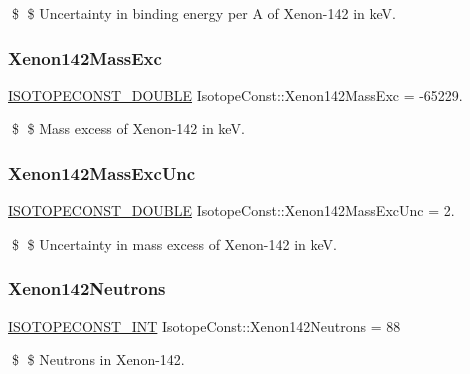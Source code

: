 \$ \$ Uncertainty in binding energy per A of Xenon-\/142 in keV. \mbox{\label{group___isotope_const-_xenon-_xe142_gae34499aaadfbe1bd03d57755a873721e}} 
\subsubsection{\texorpdfstring{Xenon142\+Mass\+Exc}{Xenon142MassExc}}
{\footnotesize\ttfamily \mbox{\hyperlink{group___isotope_const-_macros_ga8f45a7272ce02c0b4c65c44636ed719a}{I\+S\+O\+T\+O\+P\+E\+C\+O\+N\+S\+T\+\_\+\+D\+O\+U\+B\+LE}} Isotope\+Const\+::\+Xenon142\+Mass\+Exc = -\/65229.}

\$ \$ Mass excess of Xenon-\/142 in keV. \mbox{\label{group___isotope_const-_xenon-_xe142_gacaafa7d0f2390569838eb1dc602a7604}} 
\subsubsection{\texorpdfstring{Xenon142\+Mass\+Exc\+Unc}{Xenon142MassExcUnc}}
{\footnotesize\ttfamily \mbox{\hyperlink{group___isotope_const-_macros_ga8f45a7272ce02c0b4c65c44636ed719a}{I\+S\+O\+T\+O\+P\+E\+C\+O\+N\+S\+T\+\_\+\+D\+O\+U\+B\+LE}} Isotope\+Const\+::\+Xenon142\+Mass\+Exc\+Unc = 2.}

\$ \$ Uncertainty in mass excess of Xenon-\/142 in keV. \mbox{\label{group___isotope_const-_xenon-_xe142_ga228600ec3be5ff5034fce83a241156c7}} 
\subsubsection{\texorpdfstring{Xenon142\+Neutrons}{Xenon142Neutrons}}
{\footnotesize\ttfamily \mbox{\hyperlink{group___isotope_const-_macros_ga5f18360b3e99483a35c32d789e62621c}{I\+S\+O\+T\+O\+P\+E\+C\+O\+N\+S\+T\+\_\+\+I\+NT}} Isotope\+Const\+::\+Xenon142\+Neutrons = 88}

\$ \$ Neutrons in Xenon-\/142. \mbox{\label{group___isotope_const-_xenon-_xe142_gadfdf1d6958b4e246667a06bc7acc5413}} 
